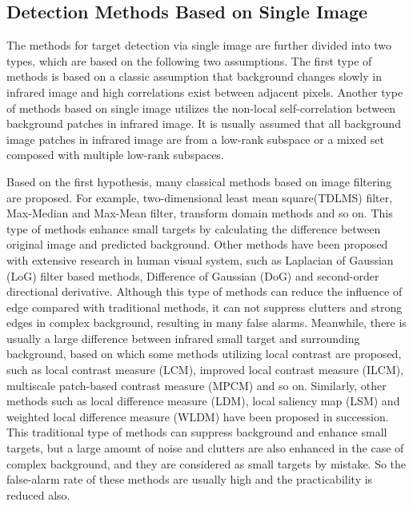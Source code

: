 \documentclass[journal]{IEEEtran}
\begin{document}
\subsection{Detection Methods Based on Single Image}
The methods for target detection via single image are further divided into two types, which are based on the following two assumptions. The first type of methods is based on a classic assumption that background changes slowly in infrared image and high correlations exist between adjacent pixels. Another type of methods based on single image utilizes the non-local self-correlation between background patches in infrared image. It is usually assumed that all background image patches in infrared image are from a low-rank subspace or a mixed set composed with multiple low-rank subspaces\cite{liu2013robust}.

Based on the first hypothesis, many classical methods based on image filtering are proposed. For example, two-dimensional least mean square(TDLMS) filter\cite{hadhoud1988two}, Max-Median and Max-Mean filter\cite{deshpande1999max}, transform domain methods \cite{davidson2002wavelet,peng2004dim} and so on. This type of methods enhance small targets by calculating the difference between original image and predicted background. Other methods have been proposed with extensive research in human visual system, such as Laplacian of Gaussian (LoG) filter based methods\cite{kim2009small}, Difference of Gaussian (DoG)\cite{wang2012infrared} and second-order directional derivative\cite{qi2013robust}. Although this type of methods can reduce the influence of edge compared with traditional methods, it can not suppress clutters and strong edges in complex background, resulting in many false alarms. Meanwhile, there is usually a large difference between infrared small target and surrounding background, based on which some methods utilizing local contrast are proposed, such as local contrast measure (LCM)\cite{chen2014local}, improved local contrast measure (ILCM)\cite{han2014robust}, multiscale patch-based contrast measure (MPCM)\cite{wei2016multiscale} and so on. Similarly, other methods such as local difference measure (LDM)\cite{deng2017entropy}, local saliency map (LSM)\cite{chen2016efficient} and weighted local difference measure (WLDM)\cite{deng2016small} have been proposed in succession. This traditional type of methods can suppress background and enhance small targets, but a large amount of noise and clutters are also enhanced in the case of complex background, and they are considered as small targets by mistake. So the false-alarm rate of these methods are usually high and the practicability is reduced also.
\end{document}
